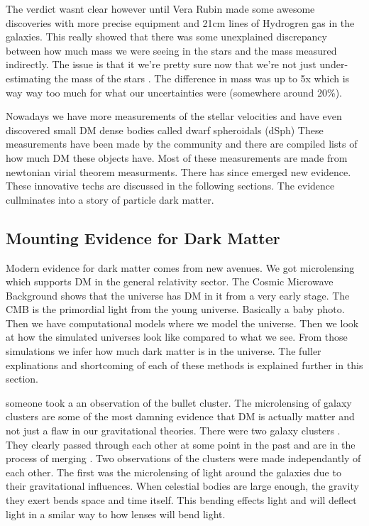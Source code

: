The verdict wasnt clear however until Vera Rubin made some awesome discoveries with more precise equipment and 21cm lines of Hydrogren gas in the galaxies.
This really showed that there was some unexplained discrepancy between how much mass we were seeing in the stars and the mass measured indirectly.
The issue is that it we're pretty sure now that we're not just under-estimating the mass of the stars \ns.
The difference in mass was up to 5x which is way way too much for what our uncertainties were (somewhere around 20\%)\ns.


Nowadays we have more measurements of the stellar velocities and have even discovered small DM dense bodies called dwarf spheroidals (dSph)
These measurements have been made by the community \fu and there are compiled lists of how much DM these objects have.
Most of these measurements are made from newtonian virial theorem measurments.
There has since emerged new evidence.
These innovative techs are discussed in the following sections. The evidence cullminates into a story of particle dark matter.

\subsection{Mounting Evidence for Dark Matter\label{secc:ev4dm_more}}
Modern evidence for dark matter comes from new avenues.
We got microlensing which supports DM in the general relativity sector.
The Cosmic Microwave Background shows that the universe has DM in it from a very early stage.
The CMB is the primordial light from the young universe.
Basically a baby photo.
Then we have computational models where we model the universe.
Then we look at how the simulated universes look like compared to what we see.
From those simulations we infer how much dark matter is in the universe.
The fuller explinations and shortcoming of each of these methods is explained further in this section.

someone took a an observation of the bullet cluster.
The microlensing of galaxy clusters are some of the most damning evidence that DM is actually matter and not just a flaw in our gravitational theories.
There were two galaxy clusters \fu.
They clearly passed through each other at some point in the past and are in the process of merging \ns.
Two observations of the clusters were made independantly of each other.
The first was the microlensing of light around the galaxies due to their gravitational influences.
When celestial bodies are large enough, the gravity they exert bends space and time itself.
This bending effects light and will deflect light in a smilar way to how lenses will bend light.

